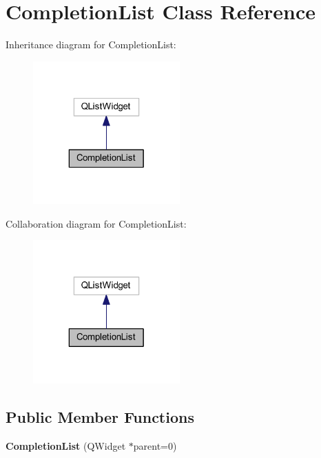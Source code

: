 \hypertarget{class_completion_list}{\section{Completion\-List Class Reference}
\label{class_completion_list}
}


Inheritance diagram for Completion\-List\-:
\nopagebreak
\begin{figure}[H]
\begin{center}
\leavevmode
\includegraphics[width=160pt]{class_completion_list__inherit__graph}
\end{center}
\end{figure}


Collaboration diagram for Completion\-List\-:
\nopagebreak
\begin{figure}[H]
\begin{center}
\leavevmode
\includegraphics[width=160pt]{class_completion_list__coll__graph}
\end{center}
\end{figure}
\subsection*{Public Member Functions}
\begin{DoxyCompactItemize}
\item 
\hypertarget{class_completion_list_a034646a1bed739474eddd96ad6e2c739}{{\bfseries Completion\-List} (Q\-Widget $\ast$parent=0)}\label{class_completion_list_a034646a1bed739474eddd96ad6e2c739}

\end{DoxyCompactItemize}
